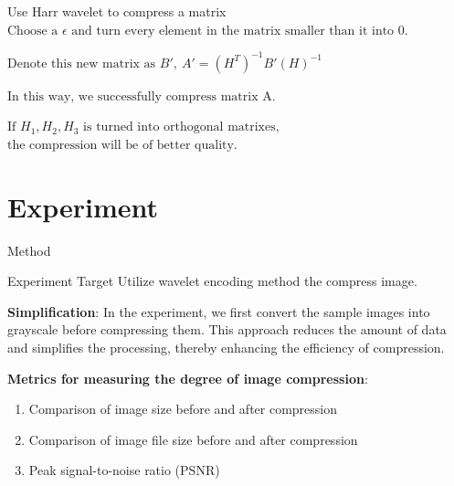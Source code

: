 \documentclass{beamer}
\begin{document}
\begin{frame}{Use Harr wavelet to compress a matrix}
$\text{Choose a $\epsilon$ and turn every element in the matrix smaller than it into 0.}$

$\text{Denote this new matrix as $B',\ A'=(H^T)^{-1}B'(H)^{-1}$}$

$\text{In this way, we successfully compress matrix A.}$

\medskip

$\text{If $H_1,H_2,H_3$ is turned into orthogonal matrixes, }$
$\text{the compression will be of better quality.}$
\end{frame}

\section{Experiment}

\begin{frame}{Method}

\begin{MyBox}{Experiment Target}
	Utilize wavelet encoding method the compress image.
\end{MyBox}
		
\medskip

\textbf{Simplification}: In the experiment, we first convert the sample images into grayscale before compressing them. This approach reduces the amount of data and simplifies the processing, thereby enhancing the efficiency of compression. \\

\medskip

\textbf{Metrics for measuring the degree of image compression}: 
\begin{enumerate}
	\item Comparison of image size before and after compression
	\item Comparison of image file size before and after compression
	\item Peak signal-to-noise ratio (PSNR)
\end{enumerate}

\end{frame}
\end{document}
